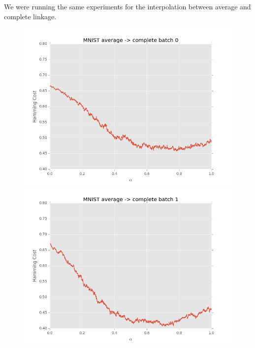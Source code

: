 We were running the same experiments for the interpolation between average and complete linkage.

\begin{figure}[h]
\centering
\begin{minipage}{.3\textwidth}
  \centering
  \includegraphics[width=\linewidth]{images/mnist-ac-0}
\end{minipage}
\begin{minipage}{.3\textwidth}
  \centering
  \includegraphics[width=\linewidth]{images/mnist-ac-1}
\end{minipage}
\begin{minipage}{.3\textwidth}
  \centering

\end{minipage}
\end{figure}
